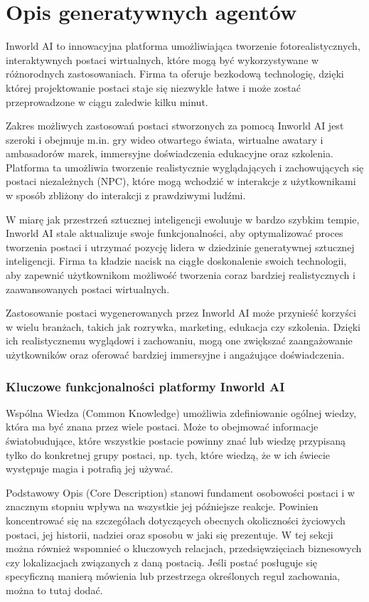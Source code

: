 \section{Opis generatywnych agentów}\label{section:ch4_2}

Inworld AI to innowacyjna platforma umożliwiająca tworzenie fotorealistycznych, interaktywnych postaci
wirtualnych, które mogą być wykorzystywane w różnorodnych zastosowaniach. Firma ta oferuje bezkodową
technologię, dzięki której projektowanie postaci staje się niezwykle łatwe i może zostać przeprowadzone w
ciągu zaledwie kilku minut.

Zakres możliwych zastosowań postaci stworzonych za pomocą Inworld AI jest szeroki i obejmuje m.in. gry
wideo otwartego świata, wirtualne awatary i ambasadorów marek, immersyjne doświadczenia edukacyjne oraz
szkolenia. Platforma ta umożliwia tworzenie realistycznie wyglądających i zachowujących się postaci
niezależnych (NPC), które mogą wchodzić w interakcje z użytkownikami w sposób zbliżony do interakcji z
prawdziwymi ludźmi.

W miarę jak przestrzeń sztucznej inteligencji ewoluuje w bardzo szybkim tempie, Inworld AI stale
aktualizuje swoje funkcjonalności, aby optymalizować proces tworzenia postaci i utrzymać pozycję lidera
w dziedzinie generatywnej sztucznej inteligencji. Firma ta kładzie nacisk na ciągłe doskonalenie swoich
technologii, aby zapewnić użytkownikom możliwość tworzenia coraz bardziej realistycznych i zaawansowanych
postaci wirtualnych.

Zastosowanie postaci wygenerowanych przez Inworld AI może przynieść korzyści w wielu branżach, takich
jak rozrywka, marketing, edukacja czy szkolenia. Dzięki ich realistycznemu wyglądowi i zachowaniu, mogą
one zwiększać zaangażowanie użytkowników oraz oferować bardziej immersyjne i angażujące doświadczenia.

\subsubsection*{Kluczowe funkcjonalności platformy Inworld AI}

Wspólna Wiedza (Common Knowledge) umożliwia zdefiniowanie ogólnej wiedzy, która ma być znana przez wiele
postaci. Może to obejmować informacje światobudujące, które wszystkie postacie powinny znać lub wiedzę
przypisaną tylko do konkretnej grupy postaci, np. tych, które wiedzą, że w ich świecie występuje magia
i potrafią jej używać.

Podstawowy Opis (Core Description) stanowi fundament osobowości postaci i w znacznym stopniu wpływa na
wszystkie jej późniejsze reakcje. Powinien koncentrować się na szczegółach dotyczących obecnych
okoliczności życiowych postaci, jej historii, nadziei oraz sposobu w jaki się prezentuje. W tej sekcji
można również wspomnieć o kluczowych relacjach, przedsięwzięciach biznesowych czy lokalizacjach
związanych z daną postacią. Jeśli postać posługuje się specyficzną manierą mówienia lub przestrzega
określonych reguł zachowania, można to tutaj dodać.

